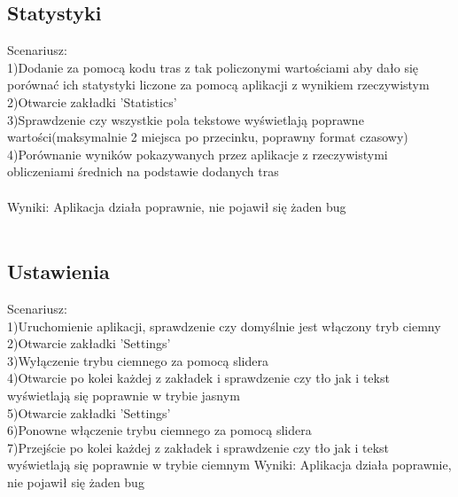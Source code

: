 \subsection{Statystyki} %
Scenariusz:\\
1)Dodanie za pomocą kodu tras z tak policzonymi wartościami aby dało się porównać ich statystyki liczone za pomocą aplikacji z wynikiem rzeczywistym\\
2)Otwarcie zakładki 'Statistics'\\
3)Sprawdzenie czy wszystkie pola tekstowe wyświetlają poprawne wartości(maksymalnie 2 miejsca po przecinku, poprawny format czasowy)\\
4)Porównanie wyników pokazywanych przez aplikacje z rzeczywistymi obliczeniami średnich na podstawie dodanych tras\\\\
Wyniki: Aplikacja działa poprawnie, nie pojawił się żaden bug\\\\

\newpage
\subsection{Ustawienia} %
Scenariusz:\\
1)Uruchomienie aplikacji, sprawdzenie czy domyślnie jest włączony tryb ciemny\\
2)Otwarcie zakładki 'Settings'\\
3)Wyłączenie trybu ciemnego za pomocą slidera\\
4)Otwarcie po kolei każdej z zakładek i sprawdzenie czy tło jak i tekst wyświetlają się poprawnie w trybie jasnym\\
5)Otwarcie zakładki 'Settings'\\
6)Ponowne włączenie trybu ciemnego za pomocą slidera\\
7)Przejście po kolei każdej z zakładek i sprawdzenie czy tło jak i tekst wyświetlają się poprawnie w trybie ciemnym
Wyniki: Aplikacja działa poprawnie, nie pojawił się żaden bug\\\\

